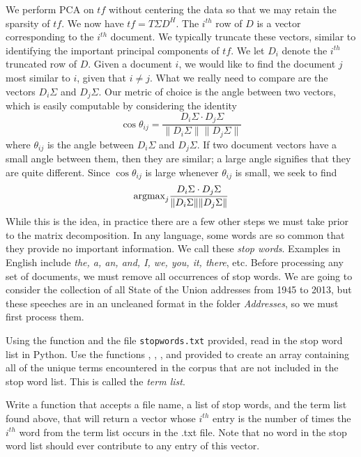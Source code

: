 We perform PCA on $t\!f$ without centering the data so that we may 
retain the sparsity of $tf$. We now have $t\!f = T\Sigma D^{H}$. 
The $i^{th}$ row of $D$ is a vector corresponding to the $i^{th}$ document. 
We typically truncate these vectors, similar to identifying the important 
principal components of $t\!f$. We let $D_{i}$ denote the $i^{th}$ truncated row of $D$. 
Given a document $i$, we would like to find the document $j$ most similar to $i$, 
given that $i \neq j$. What we really need to compare are the vectors 
$D_{i}\Sigma$ and $D_{j}\Sigma$. Our metric of choice is the angle between 
two vectors, which is easily computable by considering the identity 
\begin{equation*}
\cos \theta_{ij} = \frac{D_{i}\Sigma \cdot D_{j}\Sigma}{\|D_{i}\Sigma\| \|D_{j}\Sigma\|}
\end{equation*}
where $\theta_{ij}$ is the angle between $D_{i}\Sigma$ and $D_{j}\Sigma$. 
If two document vectors have a small angle between them, then they are similar; 
a large angle signifies that they are quite different. 
Since $\cos \theta_{ij}$ is large whenever $\theta_{ij}$ is small, we seek to find 
\begin{equation*}
\mbox{argmax}_{j} \frac{D_{i}\Sigma \cdot D_{j}\Sigma}{\|D_{i}\Sigma\| \|D_{j}\Sigma\|}
\end{equation*}
While this is the idea, in practice there are a few other steps we must take prior 
to the matrix decomposition. In any language, some words are so common that they 
provide no important information. We call these \emph{stop words}. 
Examples in English include \emph{the, a, an, and, I, we, you, it, there}, etc. 
Before processing any set of documents, we must remove all occurrences of stop words. 
We are going to consider the collection of all State of the Union addresses 
from 1945 to 2013, but these speeches are in an uncleaned format in the folder 
\emph{Addresses}, so we must first process them.

\begin{problem}
Using the function  and the file 
\texttt{stopwords.txt} provided, read in the stop word list in Python. 
Use the functions , , , 
and  provided to create an array containing all of the unique 
terms encountered in the corpus that are not included in the stop word list. 
This is called the \emph{term list}.
\end{problem}

\begin{problem}
Write a function that accepts a file name, a list of stop words, and the term list 
found above, that will return a vector whose $i^{th}$ entry is the number of 
times the $i^{th}$ word from the term list occurs in the .txt file. 
Note that no word in the stop word list should ever contribute to any entry of this vector.
\end{problem}

